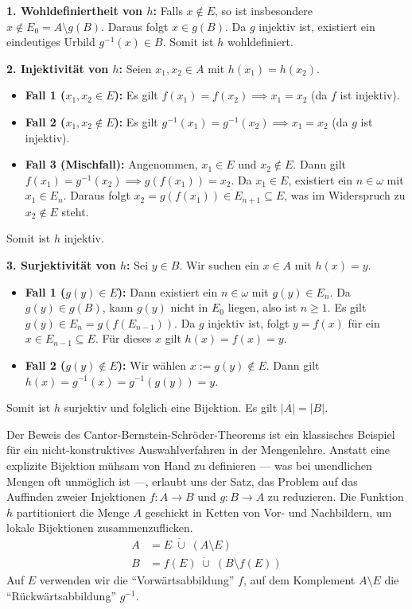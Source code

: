 \begin{math-stroke}
\begin{short-proof}
\textbf{1. Wohldefiniertheit von $h$:}
Falls $x \notin E$, so ist insbesondere $x \notin E_0 = A \setminus g(B)$. Daraus folgt $x \in g(B)$. Da $g$ injektiv ist, existiert ein eindeutiges Urbild $g^{-1}(x) \in B$. Somit ist $h$ wohldefiniert.

\textbf{2. Injektivität von $h$:}
Seien $x_1, x_2 \in A$ mit $h(x_1) = h(x_2)$.
\begin{itemize}
    \item \textbf{Fall 1 ($x_1, x_2 \in E$):} Es gilt $f(x_1) = f(x_2) \implies x_1 = x_2$ (da $f$ ist injektiv).
    \item \textbf{Fall 2 ($x_1, x_2 \notin E$):} Es gilt $g^{-1}(x_1) = g^{-1}(x_2) \implies x_1 = x_2$ (da $g$ ist injektiv).
    \item \textbf{Fall 3 (Mischfall):} Angenommen, $x_1 \in E$ und $x_2 \notin E$. Dann gilt $f(x_1) = g^{-1}(x_2) \implies g(f(x_1)) = x_2$. Da $x_1 \in E$, existiert ein $n \in \omega$ mit $x_1 \in E_n$. Daraus folgt $x_2 = g(f(x_1)) \in E_{n+1} \subseteq E$, was im Widerspruch zu $x_2 \notin E$ steht.
\end{itemize}
Somit ist $h$ injektiv.

\textbf{3. Surjektivität von $h$:}
Sei $y \in B$. Wir suchen ein $x \in A$ mit $h(x) = y$.
\begin{itemize}
    \item \textbf{Fall 1 ($g(y) \in E$):} Dann existiert ein $n \in \omega$ mit $g(y) \in E_n$. Da $g(y) \in g(B)$, kann $g(y)$ nicht in $E_0$ liegen, also ist $n \ge 1$. Es gilt $g(y) \in E_n = g(f(E_{n-1}))$. Da $g$ injektiv ist, folgt $y = f(x)$ für ein $x \in E_{n-1} \subseteq E$. Für dieses $x$ gilt $h(x) = f(x) = y$.
    \item \textbf{Fall 2 ($g(y) \notin E$):} Wir wählen $x := g(y) \notin E$. Dann gilt $h(x) = g^{-1}(x) = g^{-1}(g(y)) = y$.
\end{itemize}
Somit ist $h$ surjektiv und folglich eine Bijektion. Es gilt $|A| = |B|$.
\end{short-proof}
\end{math-stroke}

\begin{didactic-insight}
Der Beweis des Cantor-Bernstein-Schröder-Theorems ist ein klassisches Beispiel für ein nicht-konstruktives Auswahlverfahren in der Mengenlehre. Anstatt eine explizite Bijektion mühsam von Hand zu definieren --- was bei unendlichen Mengen oft unmöglich ist ---, erlaubt uns der Satz, das Problem auf das Auffinden zweier Injektionen $f \colon A \to B$ und $g \colon B \to A$ zu reduzieren. Die Funktion $h$ partitioniert die Menge $A$ geschickt in Ketten von Vor- und Nachbildern, um lokale Bijektionen zusammenzuflicken.
\begin{align*}
  A &= E \;\dot{\cup}\; (A \setminus E) \\
  B &= f(E) \;\dot{\cup}\; (B \setminus f(E))
\end{align*}
Auf $E$ verwenden wir die ``Vorwärtsabbildung'' $f$, auf dem Komplement $A \setminus E$ die ``Rückwärtsabbildung'' $g^{-1}$.
\end{didactic-insight}


